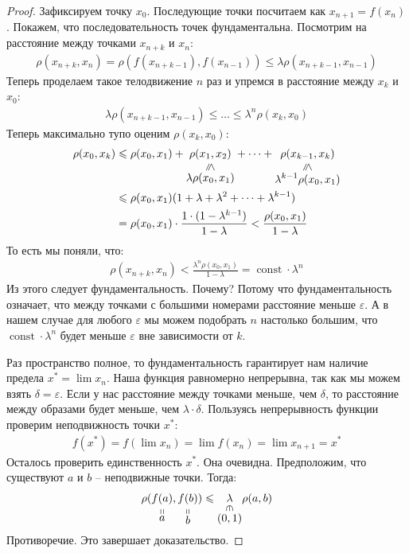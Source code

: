 \begin{proof}
    Зафиксируем точку $x_0$. Последующие точки посчитаем как $x_{n+1} = f(x_n)$. 
    Покажем, что последовательность точек фундаментальна. Посмотрим на расстояние между точками $x_{n+k}$ и $x_{n}$:
    \begin{gather*}
        \rho(x_{n+k}, x_n) = \rho(f(x_{n+k-1}), f(x_{n-1})) \leqslant \lambda \rho(x_{n+k-1}, x_{n-1})
    \end{gather*}
    Теперь проделаем такое телодвижение $n$ раз и упремся в расстояние между $x_k$ и $x_0$:
    \begin{gather*}
        \lambda \rho(x_{n+k-1}, x_{n-1}) \leqslant \dots \leqslant \lambda^n \rho(x_k, x_0)
    \end{gather*}
    Теперь максимально тупо оценим $\rho(x_k, x_0)$: 
    \begin{align*}
        \rho(x_0, x_k) &\leqslant \rho(x_0, x_1) + \lessbelow{\rho(x_1, x_2)}{\lambda \rho(x_0, x_1)} + \dots + \lessbelow{\rho(x_{k-1}, x_k)}{\lambda^{k-1} \rho(x_0, x_1)} \\
        &\leqslant \rho(x_0, x_1) (1 + \lambda + \lambda^2 + \dots + \lambda^{k-1}) \\
        &= \rho(x_0, x_1) \cdot \frac{1 \cdot (1 - \lambda^{k-1})}{1 - \lambda} < \frac{\rho(x_0, x_1)}{1 - \lambda}
    \end{align*}
    То есть мы поняли, что:
    \begin{gather*}
        \rho(x_{n+k}, x_n) < \frac{\lambda^n \rho(x_0, x_1)}{1 - \lambda} = \operatorname{const} \cdot \lambda^n
    \end{gather*}
    Из этого следует фундаментальность. Почему? Потому что фундаментальность означает, что между точками с большими номерами расстояние 
    меньше $\varepsilon$. А в нашем случае для любого $\varepsilon$ мы можем подобрать $n$ настолько большим, 
    что $\operatorname{const} \cdot \lambda^n$ будет меньше $\varepsilon$ вне зависимости от $k$.

    Раз пространство полное, то фундаментальность гарантирует нам наличие предела $x^* = \lim{x_n}$.
    Наша функция равномерно непрерывна, так как мы можем взять $\delta = \varepsilon$. Если у нас расстояние 
    между точками меньше, чем $\delta$, то расстояние между образами будет меньше, чем $\lambda \cdot \delta$. 
    Пользуясь непрерывность функции проверим неподвижность точки $x^*$:
    \begin{gather*}
        f(x^*) = f(\lim{x_n}) = \lim{f(x_n)} = \lim{x_{n+1}} = x^*
    \end{gather*}
    Осталось проверить единственность $x^*$. Она очевидна. Предположим, что существуют $a$ и $b$ -- неподвижные точки. Тогда:
    \begin{gather*}
        \rho(\stackbelow{f(a)}{a}, \stackbelow{f(b)}{b}) \leqslant \inbelow{\lambda}{(0, 1)} \rho(a, b)
    \end{gather*}
    Противоречие. Это завершает доказательство.
\end{proof}
